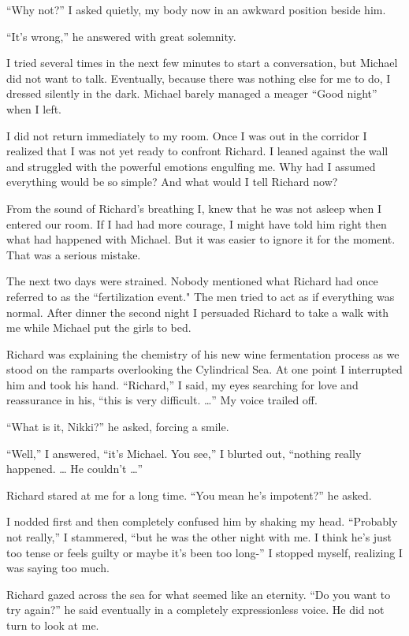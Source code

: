 \documentclass[]{article}
\begin{document}
“Why not?” I asked quietly, my body now in an awkward position beside him.

“It’s wrong,” he answered with great solemnity.

I tried several times in the next few minutes to start a conversation, but Michael did not want to talk.  Eventually, because there was nothing else for me to do, I dressed silently in the dark.  Michael barely managed a meager “Good night” when I left.

I did not return immediately to my room.  Once I was out in the corridor I realized that I was not yet ready to confront Richard.  I leaned against the wall and struggled with the powerful emotions engulfing me.  Why had I assumed everything would be so simple? And what would I tell Richard now?

From the sound of Richard’s breathing I, knew that he was not asleep when I entered our room.  If I had had more courage, I might have told him right then what had happened with Michael.  But it was easier to ignore it for the moment.  That was a serious mistake.

The next two days were strained.  Nobody mentioned what Richard had once referred to as the “fertilization event."  The men tried to act as if everything was normal.  After dinner the second night I persuaded Richard to take a walk with me while Michael put the girls to bed.

Richard was explaining the chemistry of his new wine fermentation process as we stood on the ramparts overlooking the Cylindrical Sea.  At one point I interrupted him and took his hand.  “Richard,” I said, my eyes searching for love and reassurance in his, “this is very difficult.  …” My voice trailed off.

“What is it, Nikki?” he asked, forcing a smile.

“Well,” I answered, “it’s Michael.  You see,” I blurted out, “nothing really happened.  … He couldn’t …”

Richard stared at me for a long time.  “You mean he’s impotent?” he asked.

I nodded first and then completely confused him by shaking my head.  “Probably not really,” I stammered, “but he was the other night with me.  I think he’s just too tense or feels guilty or maybe it’s been too long-” I stopped myself, realizing I was saying too much.

Richard gazed across the sea for what seemed like an eternity.  “Do you want to try again?” he said eventually in a completely expressionless voice.  He did not turn to look at me.
\end{document}

